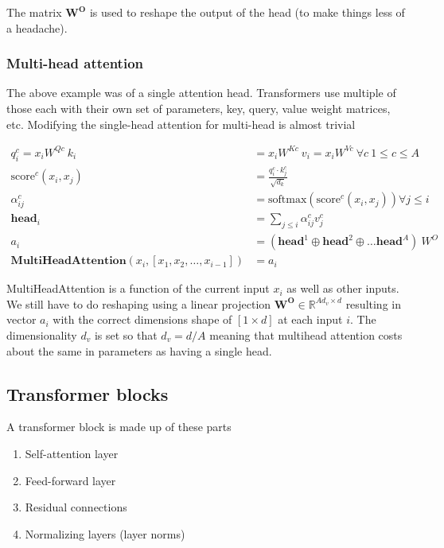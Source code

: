 \documentclass[11pt]{article}
\begin{document}
The matrix $\mathbf{W^O}$ is used to reshape the output of the head (to make things less of a headache).

\subsubsection{Multi-head attention}

The above example was of a single attention head. Transformers use multiple of those each with their own set of parameters, key, query, value weight matrices, etc. Modifying the single-head attention for multi-head is almost trivial

\begin{align*}
	q^c_i = x_i W^{Qc} \ k_i                                     & = x_i W^{Kc} \ v_i = x_i W^{Vc} \ \forall c \ 1 \le c \le A                    \\
	\text{score}^c(x_i, x_j)                                     & = \frac{q^c_i \cdot k^c_j}{\sqrt{d_k}}                                         \\
	\alpha^c_{ij}                                                & = \text{softmax}(\text{score}^c(x_i, x_j)) \forall j \le i                     \\
	\mathbf{head}_i                                              & = \sum_{j \le i} \alpha^c_{ij} v^c_j                                           \\
	a_i                                                          & = (\mathbf{head}^1 \oplus \mathbf{head}^2 \oplus \dots \mathbf{head}^A) \  W^O \\
	\mathbf{MultiHeadAttention}(x_i, [x_1, x_2, \dots, x_{i-1}]) & = a_i
\end{align*}

MultiHeadAttention is a function of the current input $x_i$ as well as other inputs. We still have to do reshaping using a linear projection $\mathbf{W^O} \in \mathbb{R}^{Ad_v \times d}$ resulting in vector $a_i$ with the correct dimensions shape of $[1 \times d]$ at each input $i$. The dimensionality $d_v$ is set so that $d_v = d/A$ meaning that multihead attention costs about the same in parameters as having a single head.

\subsection{Transformer blocks}

A transformer block is made up of these parts
\begin{enumerate}
	\item Self-attention layer
	\item Feed-forward layer
	\item Residual connections
	\item Normalizing layers (layer norms)
\end{enumerate}
\end{document}
